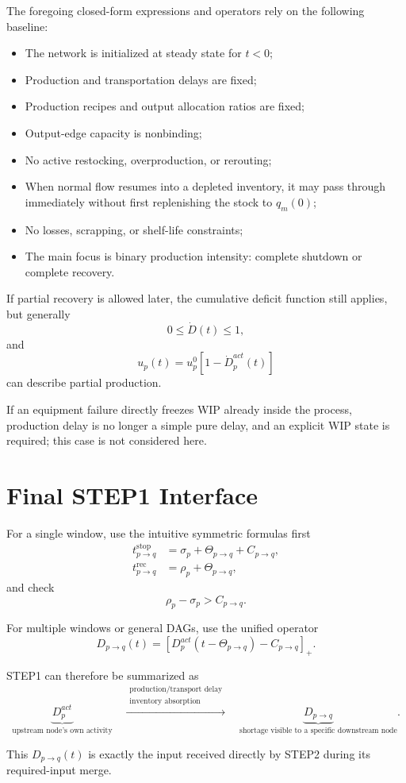 \documentclass[11pt]{article}
\begin{document}
The foregoing closed-form expressions and operators rely on the following baseline:
\begin{itemize}
    \item The network is initialized at steady state for \(t<0\);
    \item Production and transportation delays are fixed;
    \item Production recipes and output allocation ratios are fixed;
    \item Output-edge capacity is nonbinding;
    \item No active restocking, overproduction, or rerouting;
    \item When normal flow resumes into a depleted inventory, it may pass through immediately without first replenishing the stock to \(q_m(0)\);
    \item No losses, scrapping, or shelf-life constraints;
    \item The main focus is binary production intensity: complete shutdown or complete recovery.
\end{itemize}

If partial recovery is allowed later,
the cumulative deficit function still applies, but generally
\[
0\le \dot D(t)\le1,
\]
and
\[
u_p(t)=u_p^0[1-\dot D_p^{act}(t)]
\]
can describe partial production.

If an equipment failure directly freezes WIP already inside the process,
production delay is no longer a simple pure delay,
and an explicit WIP state is required; this case is not considered here.

\section{Final STEP1 Interface}

For a single window, use the intuitive symmetric formulas first
\[
\boxed{
\begin{aligned}
t_{p\to q}^{\mathrm{stop}}
&=
\sigma_p+\Theta_{p\to q}+C_{p\to q},
\\
t_{p\to q}^{\mathrm{rec}}
&=
\rho_p+\Theta_{p\to q},
\end{aligned}
}
\]
and check
\[
\rho_p-\sigma_p>C_{p\to q}.
\]

For multiple windows or general DAGs, use the unified operator
\[
\boxed{
D_{p\to q}(t)
=
\left[
D_p^{act}(t-\Theta_{p\to q})
-C_{p\to q}
\right]_+.
}
\]

STEP1 can therefore be summarized as
\[
\boxed{
\underbrace{D_p^{act}}_{\text{upstream node's own activity}}
\quad
\xrightarrow{
\substack{
\text{production/transport delay}\\
\text{inventory absorption}
}}
\quad
\underbrace{D_{p\to q}}_{\text{shortage visible to a specific downstream node}}.
}
\]

This \(D_{p\to q}(t)\) is exactly the input received directly by STEP2 during its required-input merge.
\end{document}
